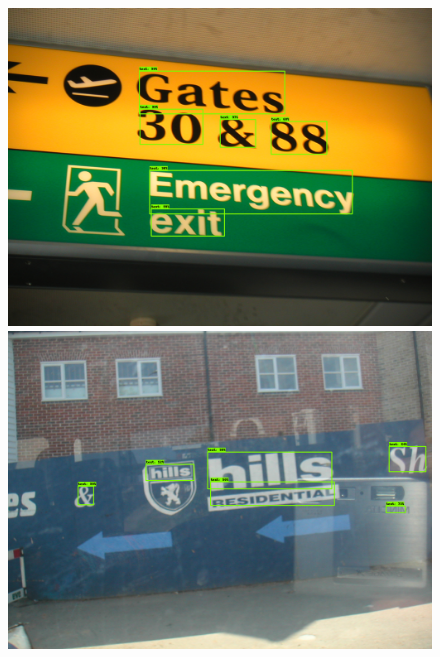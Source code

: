 \begin{figure}[!h]
	\centering

    \includegraphics[height=0.20\textheight]{VISAPP/figs/qualitative-results/icdar13/19.png}
    \includegraphics[height=0.20\textheight]{VISAPP/figs/qualitative-results/icdar13/83.png}
    
    \vspace{1.5mm}
    

\end{figure}
